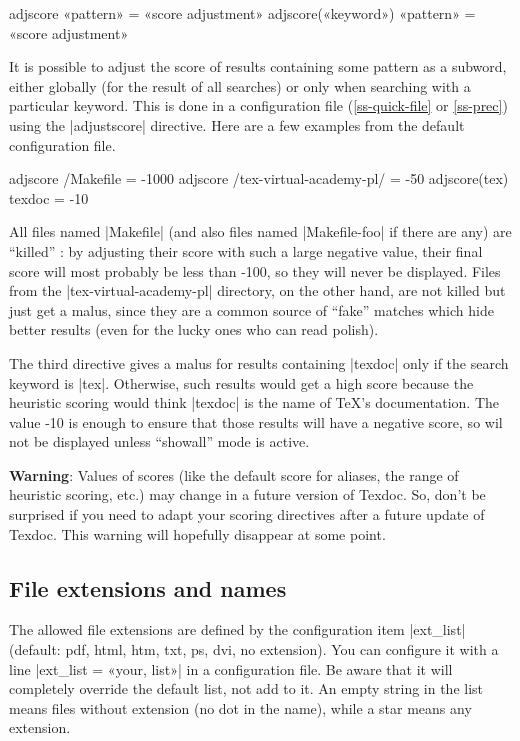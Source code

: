 \documentclass[a4paper, oneside]{scrartcl}
\makeatletter
\newenvironment{htcode}{%
  \SaveVerbatim[samepage, gobble=2]{verbmat}%
  }{%
  \endSaveVerbatim
  \par\medskip\noindent\hspace*{\parindent}%
  \BUseVerbatim{verbmat}%
  \par\medskip\@endpetrue}
\makeatother
\begin{document}
\begin{htcode}
  adjscore «pattern» = «score adjustment»
  adjscore(«keyword») «pattern» = «score adjustment»
\end{htcode}

It is possible to adjust the score of results containing some pattern as a
subword, either globally (for the result of all searches) or only when
searching with a particular keyword. This is done in a configuration file
(\ref{ss-quick-file} or \ref{ss-prec}) using the |adjustscore| directive. Here
are a few examples from the default configuration file.

\begin{htcode}
  adjscore /Makefile = -1000
  adjscore /tex-virtual-academy-pl/ = -50
  adjscore(tex) texdoc = -10
\end{htcode}

All files named |Makefile| (and also files named |Makefile-foo| if there are
any) are ``killed'' : by adjusting their score with such a large negative
value, their final score will most probably be less than -100, so they will
never be displayed. Files from the |tex-virtual-academy-pl| directory, on the
other hand, are not killed but just get a malus, since they are a common
source of ``fake'' matches which hide better results (even for the lucky ones
who can read polish).

The third directive gives a malus for results containing |texdoc| only if the
search keyword is |tex|. Otherwise, such results would get a high score
because the heuristic scoring would think |texdoc| is the name of \TeX's
documentation. The value -10 is enough to ensure that those results will have
a negative score, so wil not be displayed unless ``showall'' mode is active.

\textbf{Warning}: Values of scores (like the default score for aliases, the
range of heuristic scoring, etc.) may change in a future version of Texdoc.
So, don't be surprised if you need to adapt your scoring directives after a
future update of Texdoc.  This warning will hopefully disappear at some point.

\subsection{File extensions and names}\label{ss-ext}

The allowed file extensions are defined by the configuration item |ext_list|
(default: pdf, html, htm, txt, ps, dvi, no extension). You can configure it
with a line |ext_list = «your, list»| in a configuration file. Be aware
that it will completely override the default list, not add to it. An empty
string in the list means files without extension (no dot in the name), while a
star means any extension.
\end{document}

